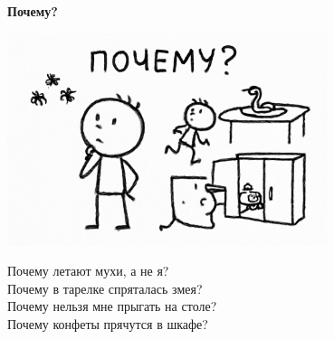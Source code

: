 \vspace*{\fill}
\begin{center}
  {\huge\textbf{Почему?}}

  \vspace{1.5em}  \includegraphics[width=0.7\textwidth]{pictures/why.png}
  \vspace{4em}
  \parbox{0.6\textwidth}{
    \LARGE
    \begin{spacing}{1.2}
      Почему летают мухи, а не я?\\
      Почему в тарелке спряталась змея?\\
      Почему нельзя мне прыгать на столе?\\
      Почему конфеты прячутся в шкафе? %
    \end{spacing}
      
  }
\end{center}
\vspace*{\fill}